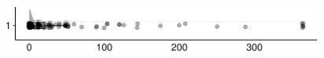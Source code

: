 \documentclass[
]{article}
\begin{document}
\begin{minipage}[t]{0.3\linewidth}

~

\end{minipage}%
\begin{minipage}[t]{0.7\linewidth}

\includegraphics[width=396px]{codebook_template_files/figure-latex/q7_33_rainplot-1}

\end{minipage}
 \vspace*{-5mm} 

\begin{minipage}[t]{0.3\linewidth}

~

\end{minipage}%
\begin{minipage}[t]{0.7\linewidth}

~

\end{minipage}
 \vspace*{-7mm} 
\end{document}
